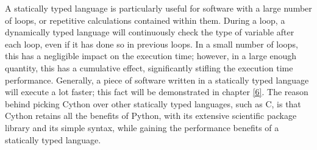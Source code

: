 A statically typed language is particularly useful for software with a large number of loops, or repetitive calculations contained within them. During a loop, a dynamically typed language will continuously check the type of variable after each loop, even if it has done so in previous loops. In a small number of loops, this has a negligible impact on the execution time; however, in a large enough quantity, this has a cumulative effect, significantly stifling the execution time performance. Generally, a piece of software written in a statically typed language will execute a lot faster; this fact will be demonstrated in chapter \ref{6}. The reason behind picking Cython over other statically typed languages, such as C, is that Cython retains all the benefits of Python, with its extensive scientific package library and its simple syntax, while gaining the performance benefits of a statically typed language.

